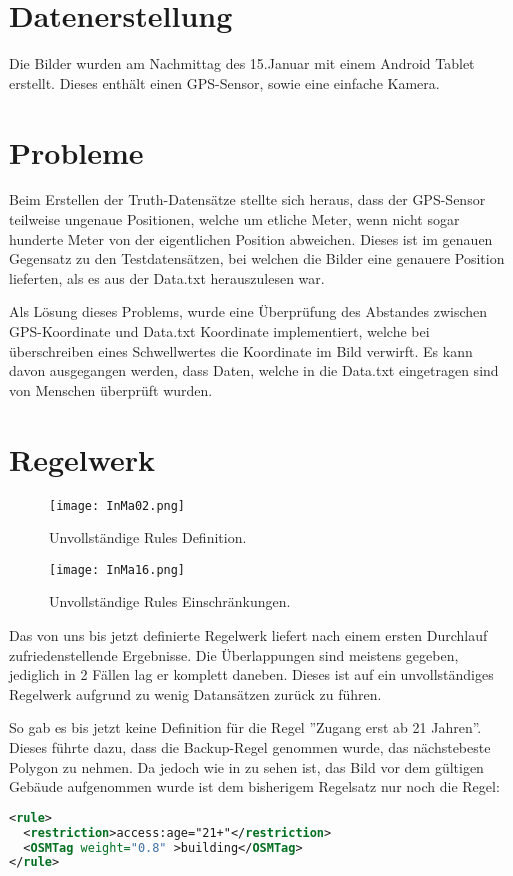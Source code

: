 \section{Datenerstellung}
Die Bilder wurden am Nachmittag des 15.Januar mit einem Android Tablet erstellt.
Dieses enthält einen GPS-Sensor, sowie eine einfache Kamera.

\section{Probleme}
Beim Erstellen der Truth-Datensätze stellte sich heraus, dass der GPS-Sensor teilweise
ungenaue Positionen, welche um etliche Meter, wenn nicht sogar hunderte Meter von
der eigentlichen Position abweichen. Dieses ist im genauen Gegensatz zu den Testdatensätzen,
bei welchen die Bilder eine genauere Position lieferten, als es aus der Data.txt
herauszulesen war.

Als Lösung dieses Problems, wurde eine Überprüfung des Abstandes zwischen GPS-Koordinate
und Data.txt Koordinate implementiert, welche bei überschreiben eines Schwellwertes
die Koordinate im Bild verwirft. Es kann davon ausgegangen werden, dass Daten, welche
in die Data.txt eingetragen sind von Menschen überprüft wurden.


\section{Regelwerk}
\begin{figure}
  \texttt{[image: InMa02.png]}
  \caption{Unvollständige Rules Definition.}
  \label{fig:NoRule}
\end{figure}

\begin{figure}
  \texttt{[image: InMa16.png]}
  \caption{Unvollständige Rules Einschränkungen.}
  \label{fig:MissingCircle}
\end{figure}
Das von uns bis jetzt definierte Regelwerk liefert nach einem ersten Durchlauf
zufriedenstellende Ergebnisse. Die Überlappungen sind meistens gegeben, jediglich
in 2 Fällen lag er komplett daneben. Dieses ist auf ein unvollständiges Regelwerk
aufgrund zu wenig Datansätzen zurück zu führen.

So gab es bis jetzt keine Definition für die Regel ''Zugang erst ab 21 Jahren''.
Dieses führte dazu, dass die Backup-Regel genommen wurde, das nächstebeste Polygon zu nehmen.
Da jedoch wie in  zu sehen ist, das Bild vor dem gültigen Gebäude aufgenommen
wurde ist dem bisherigem Regelsatz nur noch die Regel:
\begin{lstlisting}[language=xml,frame=single]
<rule>
  <restriction>access:age="21+"</restriction>
  <OSMTag weight="0.8" >building</OSMTag>
</rule>
\end{lstlisting}

